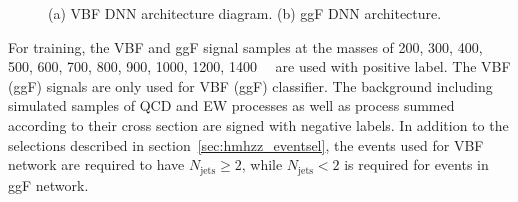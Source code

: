 \begin{figure}[htbp]
        \centering
        \caption{(a) VBF DNN architecture diagram. (b) ggF DNN architecture.}
        \label{fig:dnn_arch}
\end{figure}

For training, the VBF and ggF signal samples at the masses of 200, 300, 400, 500, 600, 700, 800, 900, 1000, 1200, 1400~\gev~ are used with positive label.
The VBF (ggF) signals are only used for VBF (ggF) classifier.
The background including simulated samples of QCD and EW \qqZZ processes as well as \ggZZ process summed according to their cross section are signed with negative labels.
In addition to the selections described in section~\ref{sec:hmhzz_eventsel}, the events used for VBF network are required to have $N_\mathrm{jets} \geq 2$, while $N_\mathrm{jets} < 2$ is required for events in ggF network.

